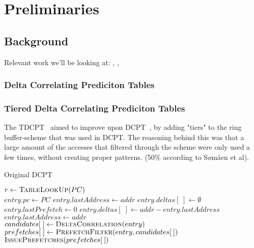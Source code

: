 \section{Preliminaries}

\subsection{Background}

Relevant work we'll be looking at: \cite{Grannaes355273}, \cite{Grannaes481837}, \cite{Jahre355239}

\subsubsection{Delta Correlating Prediciton Tables}

\subsubsection{Tiered Delta Correlating Prediciton Tables}

The TDCPT~\cite{Somaen} aimed to improve upon DCPT~\cite{Grannaes481837}, by
adding "tiers" to the ring buffer-scheme that was used in DCPT. The reasoning
behind this was that a large amount of the accesses that filtered through the
scheme were only used a few times, without creating proper patterns. (50\%
according to Sømåen et al).


\begin{algorithm}
\footnotesize
\caption{Original DCPT \cite{Grannaes481837}}
  \begin{algorithmic}[1]
      \State $r \gets \Call{TableLookUp}{PC}$ \\

        \State $entry.pc \gets PC$
        \State $entry.lastAddress \gets addr$
        \State $entry.deltas[\;] \gets \emptyset$
        \State $entry.lastPrefetch \gets 0$
        \State $entry.deltas[\;] \gets addr - entry.lastAddress$
        \State $entry.lastAddress \gets addr$ \\

        \State $candidates[\;] \gets \Call{DeltaCorrelation}{entry}$
        \State $prefetches[\;] \gets \Call{PrefetchFilter}{entry, candidates[\:]}$
        \State $\Call{IssuePrefetches}{prefetches[\:]}$
      \EndIf
    \EndProcedure
  \end{algorithmic}
\end{algorithm}

